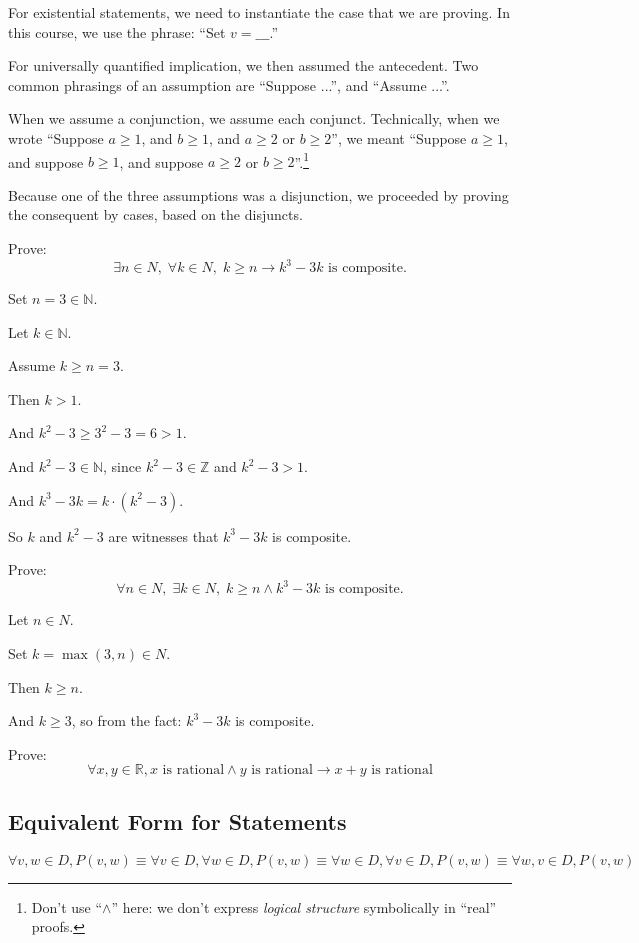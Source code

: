 \documentclass{article}
\begin{document}
For existential statements, we need to instantiate the case that we are proving. In this course, we use the phrase: “Set $v=\_\_\_$.”

For universally quantified implication, we then assumed the antecedent. Two common phrasings of an assumption
are “Suppose ...”, and “Assume ...”.

When we assume a conjunction, we assume each conjunct. Technically, when we wrote “Suppose $a \geq 1$, and $b \geq 1$,
and $a \geq 2$ or $b \geq 2$”, we meant “Suppose $a \geq 1$, and suppose $b \geq 1$, and suppose $a \geq 2$ or $b \geq 2$”.\footnote{Don’t use “$\wedge$” here: we don’t express \textit{logical
structure} symbolically in “real” proofs.}

Because one of the three assumptions was a disjunction, we proceeded by proving the consequent by cases, based on the disjuncts.

Prove:
\[
\exists n \in N, \;\forall k \in N,\; k \geq n \rightarrow k^3 - 3k \text{ is composite.}
\]

Set $n=3\in \mathbb{N}$.

Let $k\in\mathbb{N}$.

Assume $k\geq n=3$.

Then $k>1$.

And $k^2-3\geq 3^2-3=6>1$.

And $k^2-3\in\mathbb{N}$, since $k^2-3\in\mathbb{Z}$ and $k^2-3>1$.

And $k^3-3k=k\cdot (k^2-3)$.

So $k$ and $k^2-3$ are witnesses that $k^3-3k$ is composite.

Prove:
\[
\forall n \in N, \;\exists k \in N,\; k \geq  n \wedge k^3 - 3k \text{ is composite.}
\]

Let $n \in N$.

Set $k = \max(3,n) \in N$.

Then $k \geq n$.

And $k \geq 3$, so from the fact: $k^3 - 3k$ is composite.

Prove: 
\[
\forall x,y\in\mathbb{R}, x\text{ is rational}\wedge y\text{ is rational}\rightarrow x+y\text{ is rational}
\]

\subsection{Equivalent Form for Statements}
\[
\forall v,w \in D, P (v,w)\equiv 
\forall v \in D, \forall w \in D, P (v,w) \equiv
\forall w \in D, \forall v \in D, P (v,w)\equiv
\forall w, v \in D, P (v,w)
\]
\end{document}
